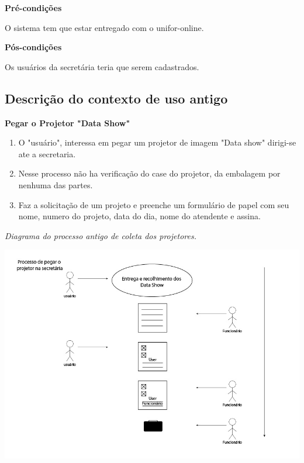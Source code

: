 \textbf{Pré-condições}


O sistema tem que estar entregado com o unifor-online. 


\textbf{Pós-condições}

Os usuários da secretária teria que serem cadastrados. 


\subsection{Descrição do contexto de uso antigo}


\textbf{Pegar o Projetor "Data Show"}


\begin{enumerate}
  
  \item O "usuário", interessa em pegar um projetor de imagem "Data show" dirigi-se ate a
  secretaria. 

  \item Nesse processo não ha verificação do case do projetor, da embalagem por
    nenhuma das partes. 

  \item Faz a solicitação de um projeto e preenche um formulário de papel com
    seu nome, numero do projeto, data do dia, nome do atendente e assina. 

\end{enumerate}

\textit{Diagrama do processo antigo de coleta dos projetores.}

  \begin{center}

    \includegraphics[scale=0.5]{imagens/fluxo1.jpg}\\

  \end{center}

